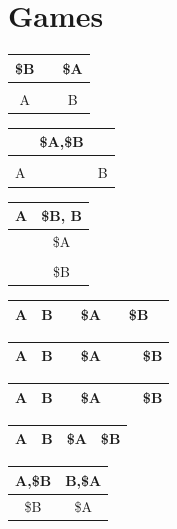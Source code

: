 \section{Games}
\begin{tabular}{|c|c|c|}
	\hline
	\$B &  \hspace{3mm}	& \$A  \\ \hline
	     &  	&       \\ \hline
	   A &  	& B     \\ \hline
\end{tabular}
\begin{tabular}{|c|c|c|}
	\hline
	 &  \$A,\$B	&   \\ \hline
	     &  	&       \\ \hline
	   A &  	& B     \\ \hline
\end{tabular}
\begin{tabular}{|c|c|}
	\hline
	 A &\$B, B   \\ \hline
	 \hspace{6mm}  &\$A       \\ \hline
	   &    \\ \hline
    \multicolumn{1}{c|}{} & \$B \\ \hline
\end{tabular}
\begin{tabular}{|c|c|c|c|c|c|c|}
	\hline
	 A & B & \hspace{2mm} & \$A & \hspace{2mm} & \$B & \hspace{2mm} \\ \hline
\end{tabular}
\begin{tabular}{|c|c|c|c|c|c|c|}
	\hline
	 A & B & \hspace{2mm} & \$A & \hspace{2mm} & \hspace{2mm} & \$B\\ \hline
\end{tabular}
\begin{tabular}{|c|c|c|c|c|c|c|}
	\hline
	 A & B & \hspace{2mm} & \$A & \hspace{2mm} & \hspace{2mm} & \$B\\ \hline
\end{tabular}
\begin{tabular}{|c|c|c|c|}
	\hline
	 A & B & \$A & \$B\\ \hline
\end{tabular}
\begin{tabular}{|c|c|}
	\hline
	 A,\$B & B,\$A   \\ \hline
	 \$B & \$A   \\ \hline
\end{tabular}


